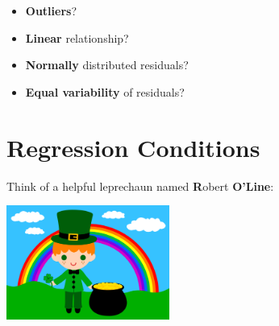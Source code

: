 \documentclass[]{article}
\providecommand{\tightlist}{%
  \setlength{\itemsep}{0pt}\setlength{\parskip}{0pt}}
\begin{document}
\begin{itemize}
\tightlist
\item
  \textbf{Outliers}?
\end{itemize}

\vspace{1cm}

\begin{itemize}
\tightlist
\item
  \textbf{Linear} relationship?
\end{itemize}

\vspace{1cm}

\begin{itemize}
\tightlist
\item
  \textbf{Normally} distributed residuals?
\end{itemize}

\vspace{1cm}

\begin{itemize}
\tightlist
\item
  \textbf{Equal variability} of residuals?
\end{itemize}

\newpage

\section{Regression Conditions}\label{regression-conditions}

Think of a helpful leprechaun named \textbf{R}obert \textbf{O'Line}:

\includegraphics[width=0.4\textwidth]{leprechaun.png}
\end{document}
